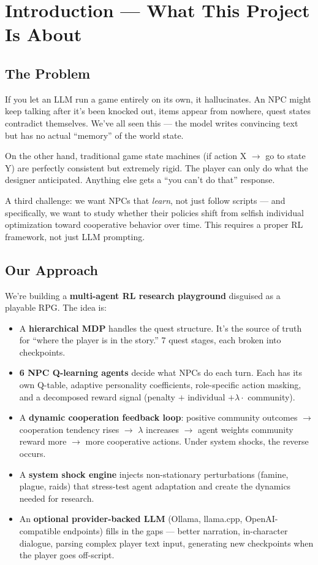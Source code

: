 \section{Introduction --- What This Project Is About}
\label{sec:introduction}

\subsection{The Problem}

If you let an LLM run a game entirely on its own, it hallucinates. An NPC might keep talking after it's been knocked out, items appear from nowhere, quest states contradict themselves. We've all seen this --- the model writes convincing text but has no actual ``memory'' of the world state.

On the other hand, traditional game state machines (if action X $\to$ go to state Y) are perfectly consistent but extremely rigid. The player can only do what the designer anticipated. Anything else gets a ``you can't do that'' response.

A third challenge: we want NPCs that \emph{learn}, not just follow scripts --- and specifically, we want to study whether their policies shift from selfish individual optimization toward cooperative behavior over time. This requires a proper RL framework, not just LLM prompting.

\subsection{Our Approach}

We're building a \textbf{multi-agent RL research playground} disguised as a playable RPG. The idea is:

\begin{itemize}
    \item A \textbf{hierarchical MDP} handles the quest structure. It's the source of truth for ``where the player is in the story.'' 7 quest stages, each broken into checkpoints.
    \item \textbf{6 NPC Q-learning agents} decide what NPCs do each turn. Each has its own Q-table, adaptive personality coefficients, role-specific action masking, and a decomposed reward signal (penalty $+$ individual $+ \lambda \cdot$ community).
    \item A \textbf{dynamic cooperation feedback loop}: positive community outcomes $\to$ cooperation tendency rises $\to$ $\lambda$ increases $\to$ agent weights community reward more $\to$ more cooperative actions. Under system shocks, the reverse occurs.
    \item A \textbf{system shock engine} injects non-stationary perturbations (famine, plague, raids) that stress-test agent adaptation and create the dynamics needed for research.
    \item An \textbf{optional provider-backed LLM} (Ollama, llama.cpp, OpenAI-compatible endpoints) fills in the gaps --- better narration, in-character dialogue, parsing complex player text input, generating new checkpoints when the player goes off-script.
\end{itemize}

